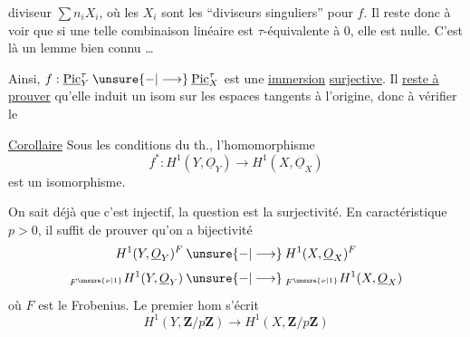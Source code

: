 diviseur $\sum n_iX_i$, où les $X_i$ sont les ``diviseurs singuliers''
pour $f$. Il reste donc à voir que si une telle combinaison linéaire est
$\tau$-équivalente à $0$, elle est nulle.
C'est là un lemme bien connu \ldots


Ainsi, $f:\underline{\mathrm{Pic}}_Y^\tau\mathbin{\unsure{-|\longrightarrow}}
\underline{\mathrm{Pic}}_X^\tau$ est une \uline{immersion}
\uline{surjective}.
Il \uline{reste à prouver} qu'elle induit un isom sur les espaces tangents
à l'origine, donc à vérifier le

\uline{Corollaire} Sous les conditions du th., l'homomorphisme
\[
f^*:H^1(Y,\underline O_Y)\longrightarrow H^1(X,\underline O_X)
\]
est un isomorphisme.

On sait déjà que c'est injectif, la question est la surjectivité.
En caractéristique $p>0$, il suffit de prouver qu'on a bijectivité
\[
H^1(Y,\underline O_Y)^F
\mathbin{\unsure{-|\longrightarrow}}
H^1(X,\underline O_X)^F
\]
\[
{}_{F^{\unsure{\nu|1}}}H^1(Y,\underline O_Y)
\mathbin{\unsure{-|\longrightarrow}}
{}_{F^{\unsure{\nu|1}}}H^1(X,\underline O_X)
\]
où $F$ est le Frobenius.
Le premier hom s'écrit
\[
H^1(Y,\mathbf Z/p\mathbf Z)\longrightarrow H^1(X,\mathbf Z/p\mathbf Z)
\]
